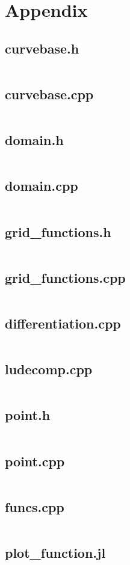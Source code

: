 \documentclass{setup}
\begin{document}
\section{Appendix}
\subsection{curvebase.h}
\inputminted{c++}{../src/curvebase.h}
\subsection{curvebase.cpp}
\inputminted{c++}{../src/curvebase.cpp}
\subsection{domain.h}
\inputminted{c++}{../src/domain.h}
\subsection{domain.cpp}
\inputminted{c++}{../src/domain.cpp}
\subsection{grid\_functions.h}
\inputminted{c++}{../src/grid_functions.h}
\subsection{grid\_functions.cpp}
\inputminted{c++}{../src/grid_functions.cpp}
\subsection{differentiation.cpp}
\inputminted{c++}{../src/differentiation.cpp}
\subsection{ludecomp.cpp}
\inputminted{c++}{../src/ludecomp.cpp}
\subsection{point.h}
\inputminted{c++}{../src/point.h}
\subsection{point.cpp}
\inputminted{c++}{../src/point.cpp}
\subsection{funcs.cpp}
\inputminted{c++}{../test/funcs.cpp}
\subsection{plot\_function.jl}
\inputminted{julia}{../src/plot_function.jl}
\end{document}

